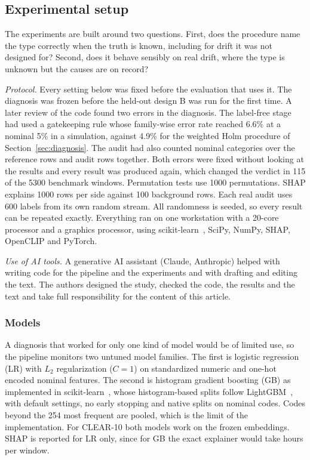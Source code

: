 \documentclass[pdflatex,referee,lineno,sn-basic]{sn-jnl}
\begin{document}
\subsection{Experimental setup}\label{sec:setup}

The experiments are built around two questions. First, does the procedure name the type correctly when the truth is known, including for drift it was not designed for? Second, does it behave sensibly on real drift, where the type is unknown but the causes are on record?

\emph{Protocol.} Every setting below was fixed before the evaluation that uses it. The diagnosis was frozen before the held-out design B was run for the first time. A later review of the code found two errors in the diagnosis. The label-free stage had used a gatekeeping rule whose family-wise error rate reached 6.6\% at a nominal 5\% in a simulation, against 4.9\% for the weighted Holm procedure of Section~\ref{sec:diagnosis}. The audit had also counted nominal categories over the reference rows and audit rows together. Both errors were fixed without looking at the results and every result was produced again, which changed the verdict in 115 of the 5300 benchmark windows. Permutation tests use 1000 permutations. SHAP explains 1000 rows per side against 100 background rows. Each real audit uses 600 labels from its own random stream. All randomness is seeded, so every result can be repeated exactly. Everything ran on one workstation with a 20-core processor and a graphics processor, using scikit-learn~\citep{pedregosa2011scikit}, SciPy, NumPy, SHAP, OpenCLIP and PyTorch.

\emph{Use of AI tools.} A generative AI assistant (Claude, Anthropic) helped with writing code for the pipeline and the experiments and with drafting and editing the text. The authors designed the study, checked the code, the results and the text and take full responsibility for the content of this article.

\subsubsection{Models}

A diagnosis that worked for only one kind of model would be of limited use, so the pipeline monitors two untuned model families. The first is logistic regression (LR) with $L_2$ regularization ($C=1$) on standardized numeric and one-hot encoded nominal features. The second is histogram gradient boosting (GB) as implemented in scikit-learn~\citep{pedregosa2011scikit}, whose histogram-based splits follow LightGBM~\citep{ke2017lightgbm}, with default settings, no early stopping and native splits on nominal codes. Codes beyond the 254 most frequent are pooled, which is the limit of the implementation. For CLEAR-10 both models work on the frozen embeddings. SHAP is reported for LR only, since for GB the exact explainer would take hours per window.
\end{document}
